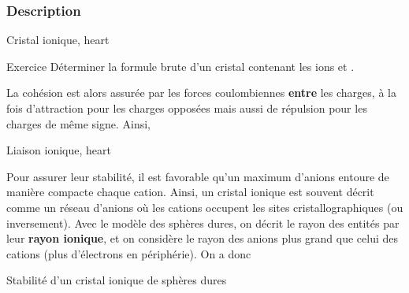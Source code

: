 \documentclass[../main/main.tex]{subfiles}
\begin{document}
\subsubsection{Description}
\begin{tdefi}{Cristal ionique, heart}
\end{tdefi}
\begin{rexem}{Exercice}
  Déterminer la formule brute d'un cristal contenant les ions  et
  .
  \tcblower
\end{rexem}
La cohésion est alors assurée par les forces coulombiennes \textbf{entre} les
charges, à la fois d'attraction pour les charges opposées mais aussi de
répulsion pour les charges de même signe. Ainsi,
\begin{tprop}{Liaison ionique, heart}
\end{tprop}

Pour assurer leur stabilité, il est favorable qu'un maximum d'anions entoure de
manière compacte chaque cation. Ainsi, un cristal ionique est souvent décrit
comme un réseau d'anions où les cations occupent les sites cristallographiques
(ou inversement). Avec le modèle des sphères dures, on décrit le rayon des
entités par leur \textbf{rayon ionique}, et on considère le rayon des anions
plus grand que celui des cations (plus d'électrons en périphérie). On a donc
\begin{tprop}{Stabilité d'un cristal ionique de sphères dures}
\end{tprop}
\end{document}
